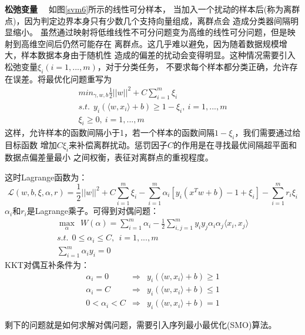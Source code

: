 \textbf{松弛变量}~~
如图\ref{svm6}所示的线性可分样本，
当加入一个扰动的样本后(称为离群点)，因为判定边界本身只有少数几个支持向量组成，离群点会
造成分类器间隔明显缩小。
虽然通过映射将低维线性不可分问题变为高维的线性可分问题，但是映射到高维空间后仍然可能存在
离群点。这几乎难以避免，因为随着数据规模增大，样本数据本身由于随机性
造成的偏差的扰动会变得明显。这种情况需要引入松弛变量$\xi_i(i=1,...,m)$，对于分类任务，
不要求每个样本都分类正确，允许存在误差。将最优化问题重写为
\begin{eqnarray}
    min_{\gamma,w,b}\frac{1}{2}||w||^2+C\sum^m_{i=1}\xi_i\\
    s.t.~~y_i(\langle{}w,x_i\rangle+b)\geq1-\xi_i,~i=1,...,m\\
    \xi_i\geq0,~i=1,...,m
\end{eqnarray}
这样，允许样本的函数间隔小于1，若一个样本的函数间隔$1-\xi_i$，我们需要通过给目标函数
增加$C\xi_i$来补偿离群扰动。惩罚因子$C$的作用是在寻找最优间隔超平面和数据点偏差量最小
之间权衡，表征对离群点的重视程度。

这时Lagrange函数为：
\begin{equation}
    \mathcal{L}(w,b,\xi,\alpha,r)=\frac{1}{2}||w||^2+C\sum^m_{i=1}\xi_i-
    \sum^m_{i=1}\alpha_i[y_i(x^Tw+b)-1+\xi_i]-\sum^m_{i=1}r_i\xi_i
\end{equation}
$\alpha_i$和$r_i$是Lagrange乘子。可得到对偶问题：
\begin{eqnarray}
    \max_\alpha~~W(\alpha)=\sum^m_{i=1}\alpha_i-\frac{1}{2}\sum^m_{i,j=1}
    y_iy_j\alpha_i\alpha_j\langle{}x_i,x_j\rangle\\
    s.t.~~0\leq\alpha_i\leq{}C,~~i=1,...,m\\
    \sum^m_{i=1}\alpha_iy_i=0
\end{eqnarray}
KKT对偶互补条件为：
\begin{eqnarray}
    \alpha_i=0&\Rightarrow&y_i(\langle{}w,x_i\rangle+b)\geq1\\
    \alpha_i=C&\Rightarrow&y_i(\langle{}w,x_i\rangle+b)\leq1\\
    0<\alpha_i<C&\Rightarrow&y_i(\langle{}w,x_i\rangle+b)=1
\end{eqnarray}

剩下的问题就是如何求解对偶问题，需要引入序列最小最优化(SMO)算法。


